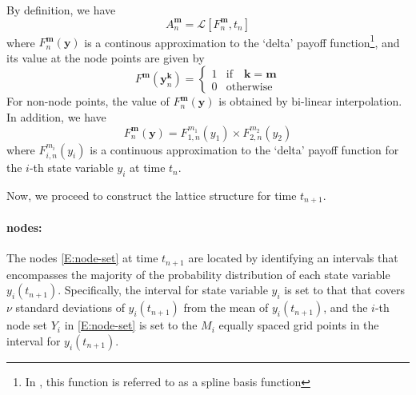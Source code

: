\documentclass{texyise}
\newcommand{\valuebackwardnodisc}{\mathcal{L}}
\begin{document}
By definition, we have
\begin{equation}
    A_{n}^{\bm{m}} = \valuebackwardnodisc[F_n^{\bm{m}}, t_n] \label{E:arrow-debreu-def}
\end{equation}
where $F_n^{\bm{m}}(\bm{y})$ is a continous approximation to the `delta' payoff function\footnote{In \cite{2fs-citi-mv}, this function is referred to as a spline basis function}, and its value at the node points are given by
\begin{equation}
    F^{\bm{m}}(\bm{y}_{n}^{\bm{k}}) = 
    \left\{
    \begin{array}{cl}
        1 & \text{if}\quad \bm{k} = \bm{m} \\
        0 & \text{otherwise}
    \end{array}
    \right.
    \label{E:delta-payoff}
\end{equation}
For non-node points, the value of $F_n^{\bm{m}}(\bm{y})$ is obtained by bi-linear interpolation. 
In addition, we have 
\begin{equation}
    F_n^{\bm{m}}(\bm{y}) = F_{1,n}^{m_1}(y_1) \times F_{2,n}^{m_2}(y_2)
\end{equation}
where $F_{i,n}^{m_i}(y_i)$ is a continuous approximation to the `delta' payoff function for the $i$-th state variable $y_i$ at time $t_n$.

Now, we proceed to construct the lattice structure for time $t_{n+1}$. 

\paragraph*{nodes:}

The nodes \eqref{E:node-set} at time $t_{n+1}$ are located by identifying an intervals that encompasses the majority of the probability distribution of each state variable $y_i(t_{n+1})$. Specifically, the interval for state variable $y_i$ is set to that that covers $\nu$ standard deviations of $y_i(t_{n+1})$ from the mean of $y_i(t_{n+1})$, and the $i$-th node set $Y_i$ in \eqref{E:node-set} is set to the $M_i$ equally spaced grid points in the interval for $y_i(t_{n+1})$.
\end{document}
